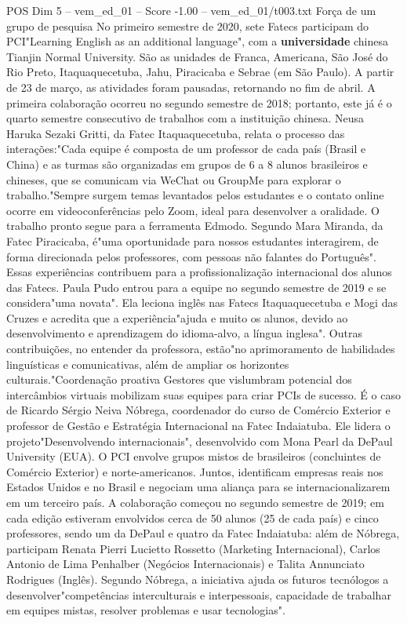 \begin{textsample}{POS Dim 5 – vem\_ed\_01 – Score -1.00 – vem\_ed\_01/t003.txt}  \label{ex:f5_pos_119}
Força de um grupo de pesquisa No primeiro semestre de 2020, sete Fatecs participam do PCI"Learning English as an additional language", com a \textbf{universidade} chinesa Tianjin Normal University.
São as unidades de Franca, Americana, São José do Rio Preto, Itaquaquecetuba, Jahu, Piracicaba e Sebrae (em São Paulo).
A partir de 23 de março, as atividades foram pausadas, retornando no fim de abril.
A primeira colaboração ocorreu no segundo semestre de 2018; portanto, este já é o quarto semestre consecutivo de trabalhos com a instituição chinesa.
Neusa Haruka Sezaki Gritti, da Fatec Itaquaquecetuba, relata o processo das interações:"Cada equipe é composta de um professor de cada país (Brasil e China) e as turmas são organizadas em grupos de 6 a 8 alunos brasileiros e chineses, que se comunicam via WeChat ou GroupMe para explorar o trabalho."Sempre surgem temas levantados pelos estudantes e o contato online ocorre em videoconferências pelo Zoom, ideal para desenvolver a oralidade.
O trabalho pronto segue para a ferramenta Edmodo.
Segundo Mara Miranda, da Fatec Piracicaba, é"uma oportunidade para nossos estudantes interagirem, de forma direcionada pelos professores, com pessoas não falantes do Português".
Essas experiências contribuem para a profissionalização internacional dos alunos das Fatecs.
Paula Pudo entrou para a equipe no segundo semestre de 2019 e se considera"uma novata".
Ela leciona inglês nas Fatecs Itaquaquecetuba e Mogi das Cruzes e acredita que a experiência"ajuda e muito os alunos, devido ao desenvolvimento e aprendizagem do idioma-alvo, a língua inglesa".
Outras contribuições, no entender da professora, estão"no aprimoramento de habilidades linguísticas e comunicativas, além de ampliar os horizontes culturais."Coordenação proativa Gestores que vislumbram potencial dos intercâmbios virtuais mobilizam suas equipes para criar PCIs de sucesso.
É o caso de Ricardo Sérgio Neiva Nóbrega, coordenador do curso de Comércio Exterior e professor de Gestão e Estratégia Internacional na Fatec Indaiatuba.
Ele lidera o projeto"Desenvolvendo internacionais", desenvolvido com Mona Pearl da DePaul University (EUA).
O PCI envolve grupos mistos de brasileiros (concluintes de Comércio Exterior) e norte-americanos.
Juntos, identificam empresas reais nos Estados Unidos e no Brasil e negociam uma aliança para se internacionalizarem em um terceiro país.
A colaboração começou no segundo semestre de 2019; em cada edição estiveram envolvidos cerca de 50 alunos (25 de cada país) e cinco professores, sendo um da DePaul e quatro da Fatec Indaiatuba: além de Nóbrega, participam Renata Pierri Lucietto Rossetto (Marketing Internacional), Carlos Antonio de Lima Penhalber (Negócios Internacionais) e Talita Annunciato Rodrigues (Inglês).
Segundo Nóbrega, a iniciativa ajuda os futuros tecnólogos a desenvolver"competências interculturais e interpessoais, capacidade de trabalhar em equipes mistas, resolver problemas e usar tecnologias".

\end{textsample}
